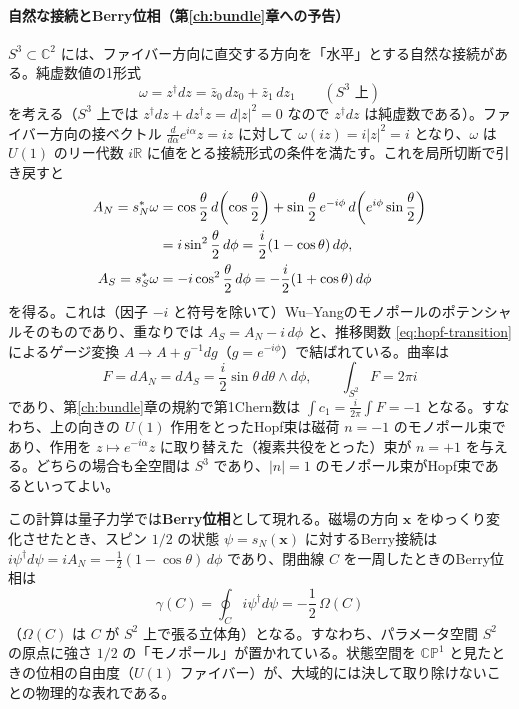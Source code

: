 \documentclass[uplatex, dvipdfmx, book]{jsbook}
\begin{document}
\paragraph{自然な接続とBerry位相（第\ref{ch:bundle}章への予告）}
$S^3 \subset \mathbb{C}^2$ には、ファイバー方向に直交する方向を「水平」とする自然な接続がある。純虚数値の1形式
\begin{equation}
    \omega = z^\dagger dz = \bar{z}_0\, dz_0 + \bar{z}_1\, dz_1 \qquad (S^3 \text{ 上})
\end{equation}
を考える（$S^3$ 上では $z^\dagger dz + dz^\dagger z = d|z|^2 = 0$ なので $z^\dagger dz$ は純虚数である）。ファイバー方向の接ベクトル $\frac{d}{d\alpha} e^{i\alpha}z = iz$ に対して $\omega(iz) = i|z|^2 = i$ となり、$\omega$ は $U(1)$ のリー代数 $i\mathbb{R}$ に値をとる接続形式の条件を満たす。これを局所切断で引き戻すと
\begin{align}
    A_N = s_N^* \omega &= \cos\frac{\theta}{2}\, d\!\left(\cos\frac{\theta}{2}\right) + \sin\frac{\theta}{2}\, e^{-i\phi}\, d\!\left(e^{i\phi} \sin\frac{\theta}{2}\right) \notag \\
    &= i\sin^2\frac{\theta}{2}\, d\phi = \frac{i}{2}(1 - \cos\theta)\, d\phi, \\
    A_S = s_S^* \omega &= -i\cos^2\frac{\theta}{2}\, d\phi = -\frac{i}{2}(1 + \cos\theta)\, d\phi
\end{align}
を得る。これは（因子 $-i$ と符号を除いて）Wu--Yangのモノポールのポテンシャルそのものであり、重なりでは $A_S = A_N - i\, d\phi$ と、推移関数 \eqref{eq:hopf-transition} によるゲージ変換 $A \to A + g^{-1}dg$（$g = e^{-i\phi}$）で結ばれている。曲率は
\begin{equation}
    F = dA_N = dA_S = \frac{i}{2} \sin\theta\, d\theta \wedge d\phi, \qquad \int_{S^2} F = 2\pi i
\end{equation}
であり、第\ref{ch:bundle}章の規約で第1Chern数は $\int c_1 = \frac{i}{2\pi}\int F = -1$ となる。すなわち、上の向きの $U(1)$ 作用をとったHopf束は磁荷 $n = -1$ のモノポール束であり、作用を $z \mapsto e^{-i\alpha}z$ に取り替えた（複素共役をとった）束が $n = +1$ を与える。どちらの場合も全空間は $S^3$ であり、$|n| = 1$ のモノポール束がHopf束であるといってよい。

この計算は量子力学では\textbf{Berry位相}として現れる。磁場の方向 $\bm{x}$ をゆっくり変化させたとき、スピン $1/2$ の状態 $\psi = s_N(\bm{x})$ に対するBerry接続は $i\psi^\dagger d\psi = iA_N = -\frac{1}{2}(1 - \cos\theta)\, d\phi$ であり、閉曲線 $C$ を一周したときのBerry位相は
\begin{equation}
    \gamma(C) = \oint_C i\psi^\dagger d\psi = -\frac{1}{2}\,\Omega(C)
\end{equation}
（$\Omega(C)$ は $C$ が $S^2$ 上で張る立体角）となる。すなわち、パラメータ空間 $S^2$ の原点に強さ $1/2$ の「モノポール」が置かれている。状態空間を $\mathbb{CP}^1$ と見たときの位相の自由度（$U(1)$ ファイバー）が、大域的には決して取り除けないことの物理的な表れである。
\end{document}

